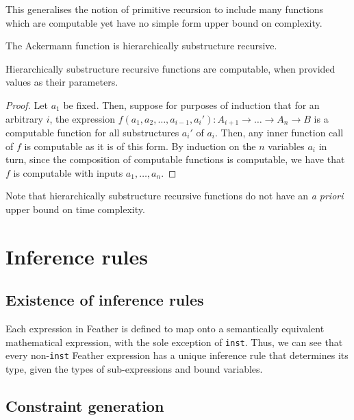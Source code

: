 \documentclass[11pt]{book}
\begin{document}
This generalises the notion of primitive recursion to include many functions which are computable yet have no simple form upper bound on complexity.
\begin{eg}
  The Ackermann function is hierarchically substructure recursive.
\end{eg}
\begin{lem}
  Hierarchically substructure recursive functions are computable, when provided values as their parameters.
\end{lem}
\begin{proof}
  Let \( a_1 \) be fixed.
  Then, suppose for purposes of induction that for an arbitrary \( i \), the expression \( f(a_1, a_2, \dots, a_{i-1}, a_i') : A_{i+1} \to \dots \to A_n \to B \) is a computable function for all substructures \( a_i' \) of \( a_i \).
  Then, any inner function call of \( f \) is computable as it is of this form.
  By induction on the \( n \) variables \( a_i \) in turn, since the composition of computable functions is computable, we have that \( f \) is computable with inputs \( a_1, \dots, a_n \).
\end{proof}
Note that hierarchically substructure recursive functions do not have an \textit{a priori} upper bound on time complexity.

\section{Inference rules}

\subsection{Existence of inference rules}

Each expression in Feather is defined to map onto a semantically equivalent mathematical expression, with the sole exception of \lstinline{inst}.
Thus, we can see that every non-\lstinline{inst} Feather expression has a unique inference rule that determines its type, given the types of sub-expressions and bound variables.

\subsection{Constraint generation}
\end{document}
